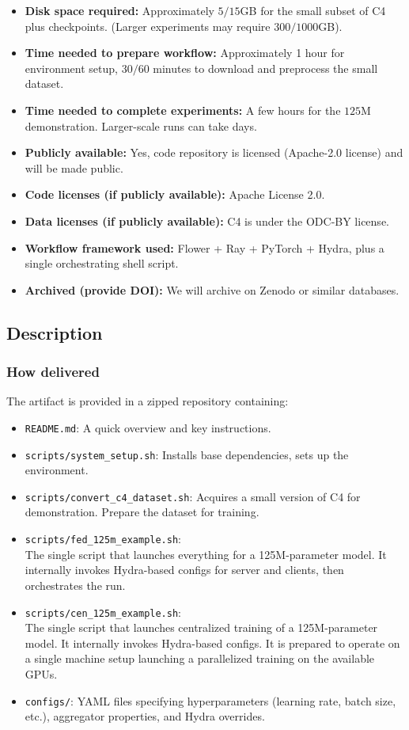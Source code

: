 \documentclass{sigplanconf}
\begin{document}
{\begin{itemize}
  \item \textbf{Disk space required:} Approximately $5/15$GB for the small subset of C4 plus checkpoints. (Larger experiments may require $300/1000$GB).
  \item \textbf{Time needed to prepare workflow:} Approximately 1 hour for environment setup, $30/60$ minutes to download and preprocess the small dataset.
  \item \textbf{Time needed to complete experiments:} A few hours for the $125$M demonstration. Larger-scale runs can take days.
  \item \textbf{Publicly available:} Yes, code repository is licensed (Apache-2.0 license) and will be made public.
  \item \textbf{Code licenses (if publicly available):} Apache License 2.0.
  \item \textbf{Data licenses (if publicly available):} C4 is under the ODC-BY license.
  \item \textbf{Workflow framework used:} Flower + Ray + PyTorch + Hydra, plus a single orchestrating shell script.
  \item \textbf{Archived (provide DOI):} We will archive on Zenodo or similar databases.
\end{itemize}
}

\subsection{Description}

\subsubsection{How delivered}
The artifact is provided in a zipped repository containing:
\begin{itemize}
  \item \texttt{README.md}: A quick overview and key instructions.
  \item \texttt{scripts/system\_setup.sh}: Installs base dependencies, sets up the environment.
  \item \texttt{scripts/convert\_c4\_dataset.sh}:  Acquires a small version of C4 for demonstration. Prepare the dataset for training.
  \item \texttt{scripts/fed\_125m\_example.sh}:\\The single script that launches everything for a 125M-parameter model. It internally invokes Hydra-based configs for server and clients, then orchestrates the run.
  \item \texttt{scripts/cen\_125m\_example.sh}:\\The single script that launches centralized training of a 125M-parameter model. It internally invokes Hydra-based configs. It is prepared to operate on a single machine setup launching a parallelized training on the available GPUs.
  \item \texttt{configs/}: YAML files specifying hyperparameters (learning rate, batch size, etc.), aggregator properties, and Hydra overrides.
\end{itemize}
\end{document}
